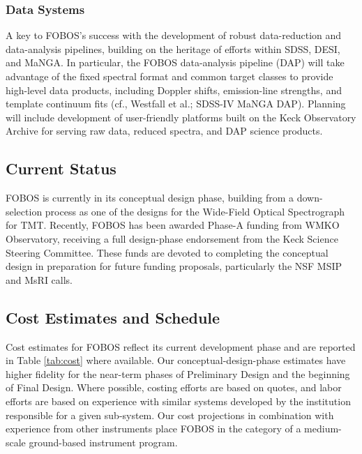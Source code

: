 \subsubsection{Data Systems} A key to FOBOS's success with the
development of robust data-reduction and data-analysis pipelines,
building on the heritage of efforts within SDSS, DESI, and MaNGA. In
particular, the FOBOS data-analysis pipeline (DAP) will take
advantage of the fixed spectral format and common target classes to
provide high-level data products, including Doppler shifts,
emission-line strengths, and template continuum fits (cf., Westfall
et al.; SDSS-IV MaNGA DAP). Planning will include development of
user-friendly platforms built on the Keck Observatory Archive for
serving raw data, reduced spectra, and DAP science products.


\subsection{Current Status} FOBOS is currently in its conceptual design
phase, building from a down-selection process as one of the designs for
the Wide-Field Optical Spectrograph for TMT. Recently, FOBOS has been
awarded Phase-A funding from WMKO Observatory, receiving a full
design-phase endorsement from the Keck Science Steering Committee. These
funds are devoted to completing the conceptual design in preparation for
future funding proposals, particularly the NSF MSIP and MsRI calls.

\subsection{Cost Estimates and Schedule}

Cost estimates for FOBOS reflect its current development phase and are reported in Table \ref{tab:cost} where available.  Our
conceptual-design-phase estimates have higher fidelity for the near-term
phases of Preliminary Design and the beginning of Final Design.  Where
possible, costing efforts are based on quotes, and labor efforts are
based on experience with similar systems developed by the institution
responsible for a given sub-system.  Our cost projections in combination with experience from other instruments place FOBOS in the
category of a medium-scale ground-based instrument program. %

